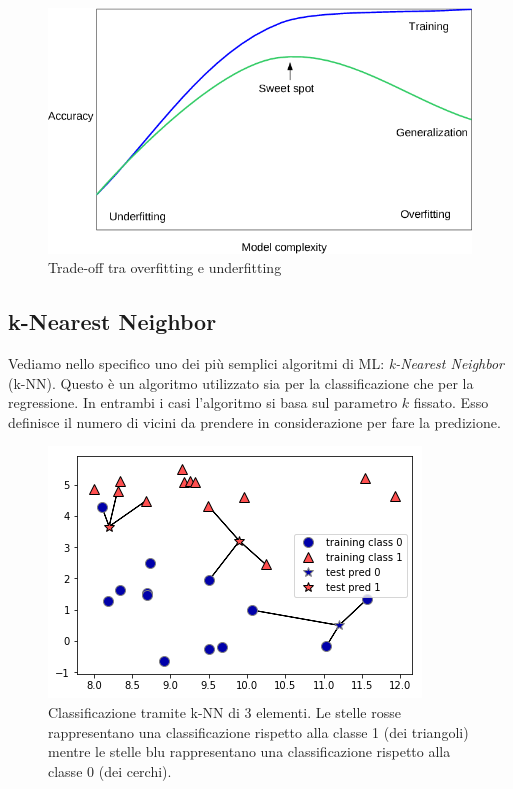 \documentclass[12pt,italian]{report}
\begin{document}
\begin{figure} [h!]


	\includegraphics[scale=0.5]{../img/tradeoff_overfitting_underfitting.png}
	\caption{Trade-off tra overfitting e underfitting}
	\label{fig:tradeoff_img}
\end{figure}


\subsection{k-Nearest Neighbor}

Vediamo nello specifico uno dei più semplici algoritmi di ML: \emph{k-Nearest Neighbor} (k-NN). Questo è un algoritmo utilizzato sia per la classificazione che per la regressione. In entrambi i casi l'algoritmo si basa sul parametro $k$ fissato. Esso definisce il numero di vicini da prendere in considerazione per fare la predizione.


\begin{figure}[h!]
	\center
	\includegraphics[scale=0.7]{../img/knn_classifier}
	\caption{Classificazione tramite k-NN di 3 elementi. Le stelle rosse rappresentano una classificazione rispetto alla classe 1 (dei triangoli) mentre le stelle blu rappresentano una classificazione rispetto alla classe 0 (dei cerchi).}
	\label{fig:knn_classifier}
\end{figure}
\end{document}
